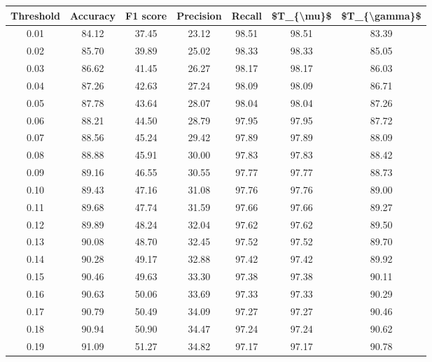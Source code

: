 \begin{tabular}{|c|c|c|c|c|c|c|}
\hline
 Threshold &  Accuracy &  F1 score &  Precision &  Recall &  \$T\_\{\textbackslash mu\}\$ &  \$T\_\{\textbackslash gamma\}\$ \\
\hline
      0.01 &     84.12 &     37.45 &      23.12 &   98.51 &      98.51 &         83.39 \\
      0.02 &     85.70 &     39.89 &      25.02 &   98.33 &      98.33 &         85.05 \\
      0.03 &     86.62 &     41.45 &      26.27 &   98.17 &      98.17 &         86.03 \\
      0.04 &     87.26 &     42.63 &      27.24 &   98.09 &      98.09 &         86.71 \\
      0.05 &     87.78 &     43.64 &      28.07 &   98.04 &      98.04 &         87.26 \\
      0.06 &     88.21 &     44.50 &      28.79 &   97.95 &      97.95 &         87.72 \\
      0.07 &     88.56 &     45.24 &      29.42 &   97.89 &      97.89 &         88.09 \\
      0.08 &     88.88 &     45.91 &      30.00 &   97.83 &      97.83 &         88.42 \\
      0.09 &     89.16 &     46.55 &      30.55 &   97.77 &      97.77 &         88.73 \\
      0.10 &     89.43 &     47.16 &      31.08 &   97.76 &      97.76 &         89.00 \\
      0.11 &     89.68 &     47.74 &      31.59 &   97.66 &      97.66 &         89.27 \\
      0.12 &     89.89 &     48.24 &      32.04 &   97.62 &      97.62 &         89.50 \\
      0.13 &     90.08 &     48.70 &      32.45 &   97.52 &      97.52 &         89.70 \\
      0.14 &     90.28 &     49.17 &      32.88 &   97.42 &      97.42 &         89.92 \\
      0.15 &     90.46 &     49.63 &      33.30 &   97.38 &      97.38 &         90.11 \\
      0.16 &     90.63 &     50.06 &      33.69 &   97.33 &      97.33 &         90.29 \\
      0.17 &     90.79 &     50.49 &      34.09 &   97.27 &      97.27 &         90.46 \\
      0.18 &     90.94 &     50.90 &      34.47 &   97.24 &      97.24 &         90.62 \\
      0.19 &     91.09 &     51.27 &      34.82 &   97.17 &      97.17 &         90.78 \\

\end{tabular}
